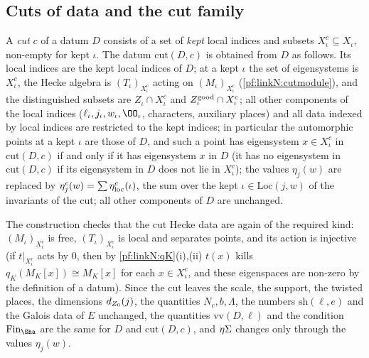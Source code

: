 \subsection{Cuts of data and the cut family}\label{sec:pf:linkN:cuts}

\begin{definition}[Cuts]\label{pf:linkN:cut}
A \emph{cut} $c$ of a datum $D$ consists of a set of \emph{kept} local indices and subsets $X^c_\iota\subseteq X_\iota$,
non-empty for kept $\iota$. The datum $\mathrm{cut}(D,c)$ is obtained from $D$ as follows. Its local indices are the kept
local indices of $D$; at a kept $\iota$ the set of eigensystems is $X^c_\iota$, the Hecke algebra is $(T_\iota)_{X^c_\iota}$
acting on $(M_\iota)_{X^c_\iota}$ (\cref{pf:linkN:cutmodule}), and the distinguished subsets are $Z_\iota\cap X^c_\iota$ and
$Z^{\mathrm{good}}_\iota\cap X^c_\iota$; all other components of the local indices ($\ell_\iota,j_\iota,w_\iota,\OO_\iota$,
characters, auxiliary places) and all data indexed by local indices are restricted to the kept indices; in particular the
automorphic points at a kept $\iota$ are those of $D$, and such a point has eigensystem $x\in X^c_\iota$ in $\mathrm{cut}(D,c)$
if and only if it has eigensystem $x$ in $D$ (it has no eigensystem in $\mathrm{cut}(D,c)$ if its eigensystem in $D$ does
not lie in $X^c_\iota$); the values $\eta_j(w)$ are replaced by $\eta^c_j(w)=\sum\eta_{\mathrm{loc}}^c(\iota)$, the sum over the kept
$\iota\in\mathrm{Loc}(j,w)$ of the invariants of the cut; all other components of $D$ are unchanged.
\end{definition}

The construction checks that the cut Hecke data are again of the required kind: $(M_\iota)_{X^c_\iota}$ is free,
$(T_\iota)_{X^c_\iota}$ is local and separates points, and its action is injective (if $t|_{X^c_\iota}$ acts by $0$, then by
\cref{pf:linkN:qK}(i),(ii) $t(x)$ kills $q_K(M_K[x])\cong M_K[x]$ for each $x\in X^c_\iota$, and these eigenspaces are
non-zero by the definition of a datum). Since the cut leaves the scale, the support, the twisted places, the dimensions
$d_{Z_0}(j)$, the quantities $N_c,b,\Lambda$, the numbers $\mathrm{sh}(\ell,e)$ and the Galois data of $E$ unchanged, the
quantities $\mathrm{vv}(D,\ell)$ and the condition $\linkNfin$ are the same for $D$ and $\mathrm{cut}(D,c)$, and
$\eta\Sigma$ changes only through the values $\eta_j(w)$.

